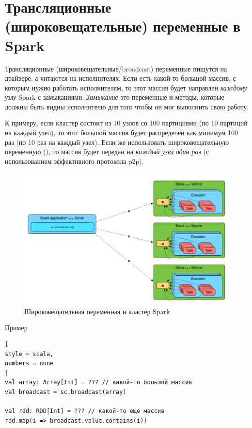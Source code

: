 \documentclass[%
	11pt,
	a4paper,
	utf8,
		]{article}
\begin{document}
\section{Трансляционные (широковещательные) переменные в Spark}

Трансляционные (широковещательные/broadcast) переменные пишутся на драйвере, а читаются на исполнителях. Если есть какой-то большой массив, с которым нужно работать исполнителям, то этот массив будет направлен \emph{каждому узлу} Spark с замыканиями. \emph{Замыкание} это переменные и методы, которые должны быть видны исполнителю для того чтобы он мог выполнить свою работу. 

К примеру, если кластер состоит из 10 узлов со 100 партициями (по 10 партиций на каждый узел), то этот большой массив будет распределен как минимум 100 раз (по 10 раз на каждый узел). Если же использовать широковещательную переменную (), то массив будет передан на \emph{каждый \underline{узел}} \emph{один раз} (с использованием эффективного протокола p2p).

\begin{figure}[h]
	\centering
	\includegraphics[scale=0.65]{figures/broadcast.png}
	\caption{ Широковещательная переменная и кластер Spark }\label{fig:broadcast}
\end{figure}

Пример
\begin{lstlisting}[
style = scala,
numbers = none	
]
val array: Array[Int] = ??? // какой-то большой массив
val broadcast = sc.broadcast(array)

val rdd: RDD[Int] = ??? // какой-то еще массив
rdd.map(i => broadcast.value.contains(i))
\end{lstlisting}
\end{document}
